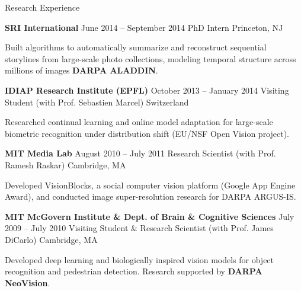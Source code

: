 \documentclass[
	10pt, %
]{resume} %
\begin{document}
\begin{rSection}{Research Experience}
	\begin{rSubsection}
	{\textbf{SRI International}} {June 2014 -- September 2014} {PhD Intern} {Princeton, NJ}
		\item Built algorithms to automatically summarize and reconstruct sequential storylines from large-scale photo collections, modeling temporal structure across millions of images \textbf{DARPA ALADDIN}.
	\end{rSubsection}

	\begin{rSubsection}
	{\textbf{IDIAP Research Institute (EPFL)}}	{October 2013 -- January 2014}	{Visiting Student (with Prof. Sebastien Marcel)} 	{Switzerland}
		\item Researched continual learning and online model adaptation for large-scale biometric recognition under distribution shift (EU/NSF Open Vision project).
	\end{rSubsection}

	\begin{rSubsection}
	{\textbf{MIT Media Lab}}	{August 2010 -- July 2011}	{Research Scientist (with Prof. Ramesh Raskar)}	{Cambridge, MA}
		\item Developed VisionBlocks, a social computer vision platform (Google App Engine Award), and conducted image super-resolution research for DARPA ARGUS-IS.

	\end{rSubsection}

	\begin{rSubsection}
	{\textbf{MIT McGovern Institute \& Dept. of Brain \& Cognitive Sciences}} 	{July 2009 -- July 2010} 	{Visiting Student \& Research Scientist (with Prof. James DiCarlo)} 	{Cambridge, MA}
		\item Developed deep learning and biologically inspired vision models for object recognition and pedestrian detection. Research supported by \textbf{DARPA NeoVision}. 
	\end{rSubsection}

\end{rSection}


\end{document}
